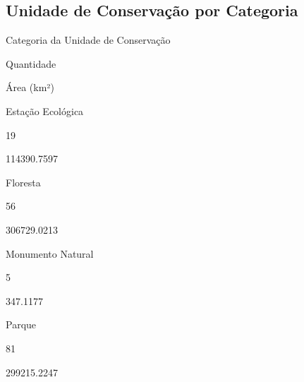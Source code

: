 \documentclass[
  letterpaper,
]{report}
\begin{document}
\hypertarget{unidade-de-conservauxe7uxe3o-por-categoria}{%
\subsection{Unidade de Conservação por
Categoria}\label{unidade-de-conservauxe7uxe3o-por-categoria}}

\n  

\n    

\n      

Categoria da Unidade de Conservação

\n      

Quantidade

\n      

Área (km²)

\n    

\n  

\n  

\n    

\n      

Estação Ecológica

\n      

19

\n      

114390.7597

\n    

\n    

\n      

Floresta

\n      

56

\n      

306729.0213

\n    

\n    

\n      

Monumento Natural

\n      

5

\n      

347.1177

\n    

\n    

\n      

Parque

\n      

81

\n      

299215.2247

\n    

\n    

\n      
\end{document}
